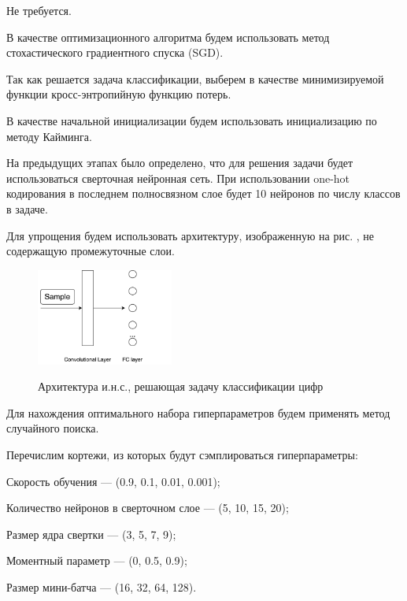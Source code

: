 \begin{textitemize}
\item Не требуется.

\item В качестве оптимизационного алгоритма будем использовать метод стохастического градиентного спуска (SGD).

\item Так как решается задача классификации, выберем в качестве минимизируемой функции кросс-энтропийную функцию потерь.

\item В качестве начальной инициализации будем использовать инициализацию по методу Кайминга.

\item На предыдущих этапах было определено, что для решения задачи будет использоваться сверточная нейронная сеть. При использовании one-hot кодирования в последнем полносвязном слое будет 10 нейронов по числу классов в задаче.

Для упрощения будем использовать архитектуру, изображенную на рис. , не содержащую промежуточные слои.

\begin{figure}[h]
	\centering
	\caption{Архитектура и.н.с., решающая задачу классификации цифр}
	\includegraphics[width=0.4\textwidth]{author/part3/figures/model.png}
	\label{fig:model}
\end{figure}

Для нахождения оптимального набора гиперпараметров будем применять метод случайного поиска.

Перечислим кортежи, из которых будут сэмплироваться гиперпараметры:
\begin{textitemize}
	\item Скорость обучения --- (0.9, 0.1, 0.01, 0.001);
	\item Количество нейронов в сверточном слое --- (5, 10, 15, 20);
	\item Размер ядра свертки --- (3, 5, 7, 9);
	\item Моментный параметр --- (0, 0.5, 0.9);
	\item Размер мини-батча --- (16, 32, 64, 128).
\end{textitemize}


\end{textitemize}
